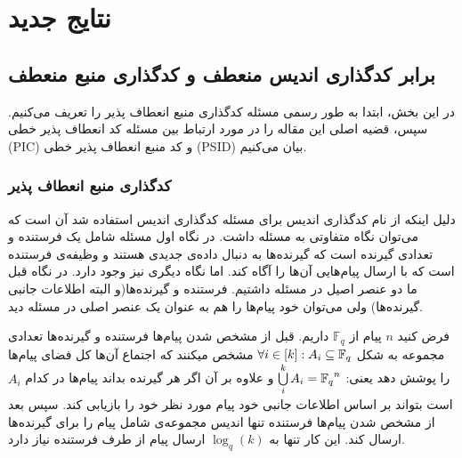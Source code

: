  
\section{نتایج جدید}
\label{sec3}
\subsection{
	برابر کدگذاری اندیس منعطف و کدگذاری منبع منعطف
}
در این بخش، ابتدا به طور رسمی مسئله کدگذاری منبع انعطاف پذیر را تعریف می‌کنیم. سپس، قضیه اصلی این مقاله را در مورد ارتباط بین مسئله کد انعطاف پذیر خطی (PIC) و کد منبع انعطاف پذیر خطی (PSID) بیان می‌کنیم.
\subsubsection{
		کدگذاری منبع انعطاف پذیر
}
\begin{recal}
	دلیل اینکه از نام کدگذاری اندیس برای مسئله کدگذاری اندیس استفاده شد آن است که می‌توان نگاه متفاوتی به مسئله داشت. در نگاه اول مسئله شامل یک فرستنده و تعدادی گیرنده است که گیرنده‌ها به دنبال داده‌ی جدیدی هستند و وظیفه‌ی فرستنده است که با ارسال پیام‌هایی آن‌ها را آگاه کند. اما نگاه دیگری نیز وجود دارد. در نگاه قبل ما دو عنصر اصیل در مسئله داشتیم. فرستنده و گیرنده‌ها(و البته اطلاعات جانبی گیرنده‌ها) ولی می‌توان خود پیام‌ها را هم به عنوان یک عنصر اصلی در مسئله دید.
	
فرض کنید 
$n$
پیام‌ از
$\mathbb{F}_q$
 داریم. قبل از مشخص شدن پیام‌ها فرستنده و گیرنده‌ها تعدادی مجموعه به شکل
 $\forall i \in [k]: A_i \subseteq {\mathbb{F}_q}$
 مشخص میکنند که اجتماع آن‌ها کل فضای پیام‌ها را پوشش دهد یعنی:
 $ \bigcup\limits_i^k A_i = {\mathbb{F}_q}^n $
 و علاوه بر آن اگر هر گیرنده بداند پیام‌ها در کدام
 $A_i$
 است بتواند بر اساس اطلاعات جانبی خود پیام مورد نظر خود را بازیابی کند. سپس بعد از مشخص شدن پیام‌ها فرستنده تنها اندیس مجموعه‌ی شامل پیام را برای گیرنده‌ها ارسال کند. این کار تنها به
 $\log_q(k)$
 ارسال پیام از طرف فرستنده نیاز دارد.
\end{recal}

